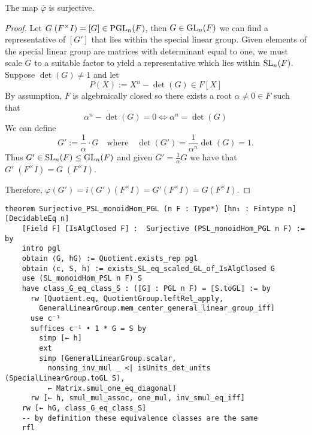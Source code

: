 \begin{lemma}
\label{Surjective_PSL_monoidHom_PGL}
\leanok
    The map $\bar{\varphi}$ is surjective.
\end{lemma}
\begin{proof}
\leanok
    Let $G \; (F^\times I) = [G] \in \operatorname{PGL}_n(F)$, then $G \in \operatorname{GL}_n(F)$ we can find a representative of $[G']$ that lies within the special linear group.
    Given elements of the special linear group are matrices with determinant equal to one, we must scale $G$ to a suitable factor to yield a representative which lies within $\operatorname{SL}_n(F)$. Suppose $\det(G) \ne 1$ and let
    \[
    P(X) := X^n - \det(G) \in F[X]
    \]
    By assumption, $F$ is algebraically closed so there exists a root $\alpha \ne 0\in F$ such that 
    \[
    \alpha^n - \det(G) = 0 \iff \alpha^n = \det(G)
    \]
    We can define
    \[
    G' := \frac{1}{\alpha} \cdot G \quad \text{where} \quad \det(G') = \frac{1}{\alpha^n} \det(G) = 1.
    \]
    Thus $G' \in \operatorname{SL}_n(F) \leq \operatorname{GL}_n(F)$ and given $G' = \frac{1}{\alpha} G$ we have that $G'  \; (F^\times I) = G \; (F^\times I)$.
    
    Therefore, $\varphi(G') = i(G') (F^\times I) = G' (F^\times I) = G (F^\times I)$.
\end{proof}
\begin{footnotesize}
\begin{verbatim}
theorem Surjective_PSL_monoidHom_PGL (n F : Type*) [hn₁ : Fintype n] [DecidableEq n]
    [Field F] [IsAlgClosed F] :  Surjective (PSL_monoidHom_PGL n F) := by
    intro pgl
    obtain ⟨G, hG⟩ := Quotient.exists_rep pgl
    obtain ⟨c, S, h⟩ := exists_SL_eq_scaled_GL_of_IsAlgClosed G
    use (SL_monoidHom_PSL n F) S
    have class_G_eq_class_S : (⟦G⟧ : PGL n F) = ⟦S.toGL⟧ := by
      rw [Quotient.eq, QuotientGroup.leftRel_apply,
        GeneralLinearGroup.mem_center_general_linear_group_iff]
      use c⁻¹
      suffices c⁻¹ • 1 * G = S by
        simp [← h]
        ext
        simp [GeneralLinearGroup.scalar,
          nonsing_inv_mul _ <| isUnits_det_units (SpecialLinearGroup.toGL S),
          ← Matrix.smul_one_eq_diagonal]
      rw [← h, smul_mul_assoc, one_mul, inv_smul_eq_iff]
    rw [← hG, class_G_eq_class_S]
    -- by definition these equivalence classes are the same
    rfl
\end{verbatim}
\end{footnotesize}

